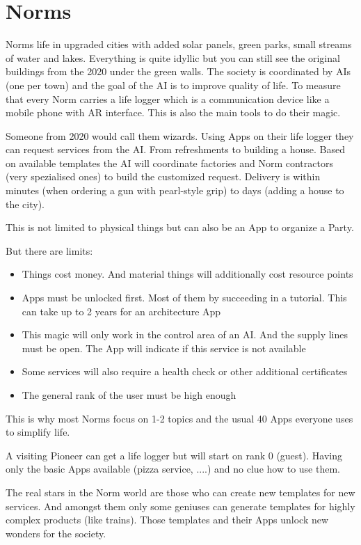 \section{Norms}

Norms life in upgraded cities with added solar panels, green parks, small streams of water and lakes. Everything is quite idyllic but you can still see the original buildings from the 2020 under the green walls.
The society is coordinated by AIs (one per town) and the goal of the AI is to improve quality of life.
To measure that every Norm carries a life logger which is a communication device like a mobile phone with AR interface. This is also the main tools to do their magic.

Someone from 2020 would call them wizards. Using Apps on their life logger they can request services from the AI. From refreshments to building a house. Based on available templates the AI will coordinate factories and Norm contractors (very spezialised ones) to build the customized request.
Delivery is within minutes (when ordering a gun with pearl-style grip) to days (adding a house to the city).

This is not limited to physical things but can also be an App to organize a Party.

But there are limits:

\begin{itemize}
    \item Things cost money. And material things will additionally cost resource points
    \item Apps must be unlocked first. Most of them by succeeding in a tutorial. This can take up to 2 years for an architecture App
    \item This magic will only work in the control area of an AI. And the supply lines must be open. The App will indicate if this service is not available
    \item Some services will also require a health check or other additional certificates
    \item The general rank of the user must be high enough
\end{itemize}

This is why most Norms focus on 1-2 topics and the usual 40 Apps everyone uses to simplify life.

A visiting Pioneer can get a life logger but will start on rank 0 (guest). Having only the basic Apps available (pizza service, ....) and no clue how to use them.

The real stars in the Norm world are those who can create new templates for new services. And amongst them only some geniuses can generate templates for highly complex products (like trains).
Those templates and their Apps unlock new wonders for the society.

